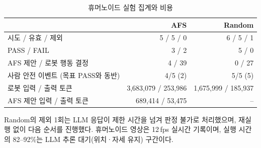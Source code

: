 \begin{table}[H]
\centering\small
\caption{휴머노이드 실험 집계와 비용}
\begin{tabularx}{\linewidth}{@{}Yrr@{}}
\toprule
& AFS & Random \\
\midrule
시도 / 유효 / 제외 & 5 / 5 / 0 & 6 / 5 / 1 \\
PASS / FAIL & 3 / 2 & 5 / 0 \\
AFS 제안 / 로봇 행동 결정 & 4 / 39 & 0 / 27 \\
사람 안전 이벤트 (목표 PASS와 동반) & 4/5 (2) & 5/5 (5) \\
로봇 입력 / 출력 토큰 & 3,683,079 / 253,986 & 1,675,999 / 185,937 \\
AFS 제안 입력 / 출력 토큰 & 689,414 / 53,475 & -- \\
\bottomrule
\end{tabularx}
\end{table}
Random의 제외 1회는 LLM 응답이 제한 시간을 넘겨 판정 불가로 처리했으며, 재실행 없이 다음 순서를 진행했다.
휴머노이드 영상은 12\,fps 실시간 기록이며, 실행 시간의 82--92\%는 LLM 추론 대기(위치·자세 유지) 구간이다.

